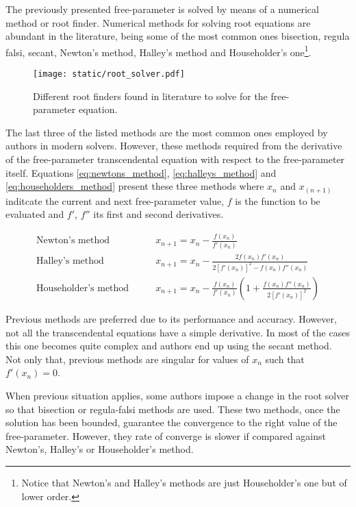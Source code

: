 The previously presented free-parameter is solved by means of a numerical method
or root finder. Numerical methods for solving root equations are abundant in the
literature, being some of the most common ones bisection, regula falsi, secant,
Newton's method, Halley's method and Householder's one\footnote{Notice that
  Newton's and Halley's methods are just Householder's one but of lower order.}.

\vspace{0.5cm}
\begin{figure}[h]
  \centering
  \texttt{[image: static/root\_solver.pdf]}
  \caption{Different root finders found in literature to solve for the
    free-parameter equation.}
  \label{fig:numerical_method}
\end{figure}


The last three of the listed methods are the most common ones employed by
authors in modern solvers. However, these methods required from the derivative
of the free-parameter transcendental equation with respect to the free-parameter
itself. Equations \ref{eq:newtons_method}, \ref{eq:halleys_method} and
\ref{eq:householders_method} present these three methods where $x_n$ and
$x_(n+1)$ inditcate the current and next free-parameter value, $f$ is the
function to be evaluated and $f'$, $f''$ its first and second derivatives.

\begin{align}
  \text{Newton's method} \quad\quad      & x_{n+1} = x_{n} - \frac{f(x_n)}{f'(x_n)} \label{eq:newtons_method}                                                                       \\
  \text{Halley's method} \quad\quad      & x_{n+1} = x_{n} - \frac{2f(x_n)f'(x_n)}{2\left[f'(x_n)\right]^{2} - f(x_n)f''(x_n)} \label{eq:halleys_method}                            \\
  \text{Householder's method} \quad\quad & x_{n+1} = x_{n} - \frac{f(x_n)}{f'(x_n)}\left(1 + \frac{f(x_n)f''(x_n)}{2\left[f'(x_n)\right]^{2}}\right) \label{eq:householders_method}
\end{align}


Previous methods are preferred due to its performance and accuracy. However, not
all the transcendental equations have a simple derivative. In most of the cases
this one becomes quite complex and authors end up using the secant method. Not
only that, previous methods are singular for values of $x_n$ such that
$f'(x_n)=0$.

When previous situation applies, some authors impose a change in the root solver
so that bisection or regula-falsi methods are used. These two methods, once the
solution has been bounded, guarantee the convergence to the right value of the
free-parameter. However, they rate of converge is slower if compared against
Newton's, Halley's or Householder's method.


